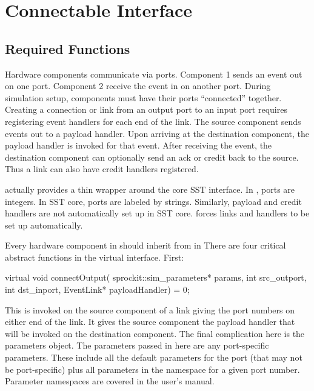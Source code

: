 
\chapter{\sstmacro Connectable Interface}\label{chapter:Connectables}

\section{Required Functions}

Hardware components communicate via ports. Component 1 sends an event out on one port.
Component 2 receive the event in on another port.
During simulation setup, components must have their ports ``connected'' together.
Creating a connection or link from an output port to an input port requires registering event handlers for each end of the link.
The source component sends events out to a payload handler. 
Upon arriving at the destination component, the payload handler is invoked for that event.
After receiving the event, the destination component can optionally send an ack or credit back to the source.
Thus a link can also have credit handlers registered.

\sstmacro actually provides a thin wrapper around the core SST interface.
In \sstmacro, ports are integers.
In SST core, ports are labeled by strings.
Similarly, payload and credit handlers are not automatically set up in SST core.
\sstmacro forces links and handlers to be set up automatically.

Every hardware component in \sstmacro should inherit from  in 
There are four critical abstract functions in the virtual interface. First:

\begin{CppCode}
  virtual void connectOutput(
    sprockit::sim_parameters* params,
    int src_outport,
    int dst_inport,
    EventLink* payloadHandler) = 0;
\end{CppCode}
This is invoked on the source component of a link giving the port numbers on either end of the link.
It gives the source component the payload handler that will be invoked on the destination component.
The final complication here is the parameters object.
The parameters passed in here are any port-specific parameters.
These include all the default parameters for the port (that may not be port-specific)
plus all parameters in the namespace  for a given port number.
Parameter namespaces are covered in the user's manual.

